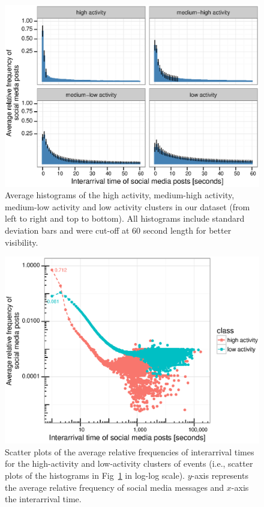 %

\begin{figure}[!htb]
  \centering
    \includegraphics[width=\textwidth]{PLOSONE/figures/plots_revision/fig4}
  \caption[Average histograms of events from different categories.]{{Average histograms of the high activity,
      medium-high activity, medium-low activity and low activity
      clusters in our dataset (from left to right and top to
      bottom). All histograms include standard deviation bars and were
      cut-off at 60 second length for better visibility.
    }}\label{fig:fig4}
\end{figure}

\begin{figure}[!htb]
  \centering
    \includegraphics[width=\textwidth]{PLOSONE/figures/plots_revision/fig5}
  \caption[Scatter plots of interarrival times]{{Scatter plots of the average relative frequencies of interarrival times
for the high-activity and low-activity clusters of events (i.e., scatter
plots of the histograms in Fig~\ref{fig:fig4} in log-log scale). $y$-axis
represents the average relative frequency of social media messages and
$x$-axis the interarrival time.
    }}\label{fig:fig5}
\end{figure}

